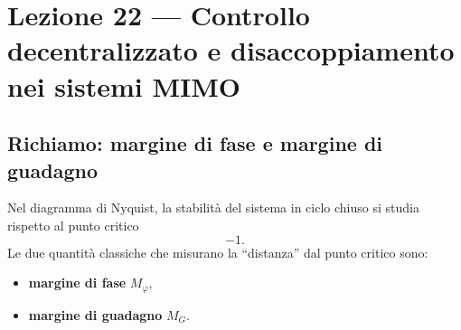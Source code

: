 \chapter{Lezione 22 --- Controllo decentralizzato e disaccoppiamento nei sistemi MIMO}

\section{Richiamo: margine di fase e margine di guadagno}

Nel diagramma di Nyquist, la stabilità del sistema in ciclo chiuso si studia rispetto al punto critico
\[
-1.
\]
Le due quantità classiche che misurano la ``distanza'' dal punto critico sono:

\begin{itemize}
    \item \textbf{margine di fase} \(M_\varphi\),
    \item \textbf{margine di guadagno} \(M_G\).
\end{itemize}

